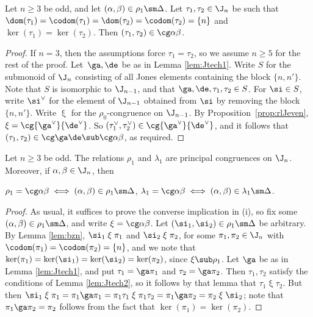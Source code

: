 %
\begin{lemma}\label{lem:Jtech2}
Let $n\geq3$ be odd, and let $(\alpha,\beta)\in\rho_1\sm\Delta$.  Let $\tau_1,\tau_2\in\J_n$ be such that $\dom(\tau_1)=\codom(\tau_1)=\dom(\tau_2)=\codom(\tau_2)=\{n\}$ and $\ker(\tau_1)=\ker(\tau_2)$.
Then $(\tau_1,\tau_2)\in\cg\alpha\beta$.
\end{lemma}

\begin{proof} If $n=3$, then the assumptions force $\tau_1=\tau_2$, so we assume $n\geq5$ for the rest of the proof.  Let~$\ga,\de$ be as in Lemma \ref{lem:Jtech1}.  Write $S$ for the submonoid of $\J_n$ consisting of all Jones elements containing the block $\{n,n'\}$.  Note that $S$ is isomorphic to $\J_{n-1}$, and that $\ga,\de,\tau_1,\tau_2\in S$.  For $\si\in S$, write $\si^\vee$ for the element of $\J_{n-1}$ obtained from $\si$ by removing the block $\{n,n'\}$.  Write $\mathrel\xi$ for the $\rho_0$-congruence on $\J_{n-1}$.  By Proposition~\ref{prop:rlJeven}, ${\mathrel\xi}=\cg{\ga^\vee}{\de^\vee}$.  So $(\tau_1^\vee,\tau_2^\vee)\in\cg{\ga^\vee}{\de^\vee}$, and it follows that $(\tau_1,\tau_2)\in\cg\ga\de\sub\cg\alpha\beta$, as required. \end{proof}



%
\begin{proposition}\label{prop:rlJodd}
Let $n\geq3$ be odd.  The relations $\rho_1$ and $\lambda_1$ are principal congruences on $\J_n$.  Moreover, if $\alpha,\beta\in\J_n$, then
\begin{itemize}\begin{multicols}{2}
 $\rho_1=\cg\alpha\beta\iff (\alpha,\beta)\in\rho_1\sm\Delta$,
 $\lambda_1=\cg\alpha\beta\iff (\alpha,\beta)\in\lambda_1\sm\Delta$.
\end{multicols}\end{itemize}
\end{proposition}

\begin{proof} As usual, it suffices to prove the converse implication in (i), so fix some $(\alpha,\beta)\in\rho_1\sm\Delta$, and
write ${\mathrel\xi}=\cg\alpha\beta$.  
Let $(\si_1,\si_2)\in\rho_1\sm\Delta$ be arbitrary.  
By Lemma \ref{lem:bzn}, $\si_1\mathrel\xi\pi_1$ and $\si_2\mathrel\xi\pi_2$, for some $\pi_1,\pi_2\in\J_n$ with $\codom(\pi_1)=\codom(\pi_2)=\{n\}$, and we note that $\ker(\pi_1)=\ker(\si_1)=\ker(\si_2)=\ker(\pi_2)$, since ${\mathrel\xi}\sub\rho_1$.  
Let $\ga$ be as in Lemma \ref{lem:Jtech1}, and put $\tau_1=\ga\pi_1$ and $\tau_2=\ga\pi_2$.  Then $\tau_1,\tau_2$ satisfy the conditions of Lemma \ref{lem:Jtech2}, so it follows by that lemma that $\tau_1\mathrel\xi\tau_2$.  But then $\si_1\mathrel\xi\pi_1=\pi_1\ga\pi_1=\pi_1\tau_1\mathrel\xi\pi_1\tau_2=\pi_1\ga\pi_2=\pi_2\mathrel\xi\si_2$; note that $\pi_1\ga\pi_2=\pi_2$ follows from the fact that $\ker(\pi_1)=\ker(\pi_2)$. \end{proof}


